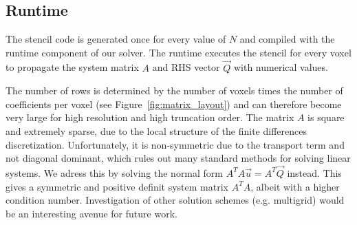 




\subsection{Runtime}
\label{sec:solver_runtime}

The stencil code is generated once for every value of $N$ and compiled with the runtime component of our solver. The runtime executes the stencil for every voxel to propagate the system matrix $A$ and RHS vector $\vec{Q}$ with numerical values.

The number of rows is determined by the number of voxels times the number of coefficients per voxel (see Figure~\ref{fig:matrix_layout}) and can therefore become very large for high resolution and high truncation order. The matrix $A$ is square and extremely sparse, due to the local structure of the finite differences discretization. Unfortunately, it is non-symmetric due to the transport term and not diagonal dominant, which rules out many standard methods for solving linear systems. We adress this by solving the normal form $A^TA\vec{u}=A^T\vec{Q}$ instead. This gives a symmetric and positive definit system matrix $A^TA$, albeit with a higher condition number. Investigation of other solution schemes (e.g. multigrid) would be an interesting avenue for future work.


